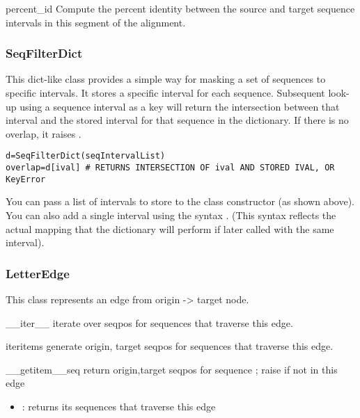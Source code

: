 \documentclass{howto}
\begin{document}
\begin{funcdesc}{percent_id}{}
  Compute the percent identity between the source and target sequence
  intervals in this segment of the alignment.
\end{funcdesc}

\subsubsection{SeqFilterDict}
This dict-like class provides a simple way for masking a set of sequences
to specific intervals.  It stores a specific interval for each
sequence.  Subsequent look-up using a sequence interval as a key will
return the intersection between that interval and the stored interval
for that sequence in the dictionary.  If there is no overlap, it
raises .

\begin{verbatim}
d=SeqFilterDict(seqIntervalList)
overlap=d[ival] # RETURNS INTERSECTION OF ival AND STORED IVAL, OR KeyError
\end{verbatim}

You can pass a list of intervals to store to the class constructor (as 
shown above).  You can also add a single interval using the syntax
.  (This syntax reflects the actual
mapping that the dictionary will perform if later called with the
same interval).

\subsubsection{LetterEdge}
This class represents an edge from origin -> target node.

\begin{funcdesc}{__iter__}{}
  iterate over seqpos for sequences that traverse this edge.
\end{funcdesc}

\begin{funcdesc}{iteritems}{}
  generate origin, target seqpos for sequences that traverse this edge.
\end{funcdesc}

\begin{funcdesc}{__getitem__}{seq}
  return origin,target seqpos for sequence ;
  raise  if not in this edge
\end{funcdesc}

\begin{itemize}
\item
{}: returns its sequences that traverse this edge
\end{itemize}
\end{document}
